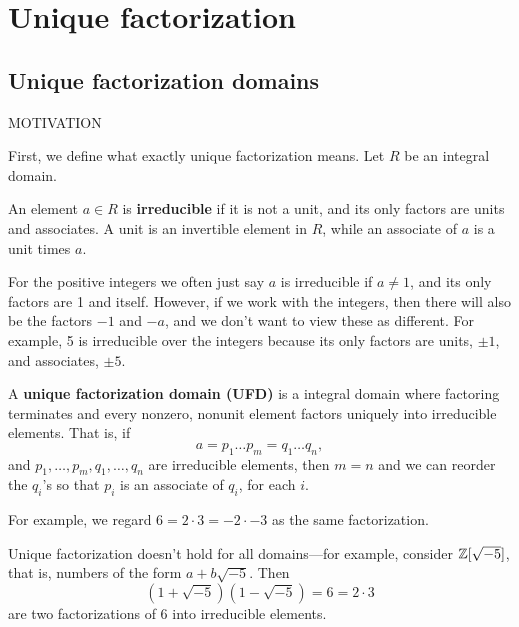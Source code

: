 \chapter{Unique factorization}\label{uf}
\section{Unique factorization domains}
MOTIVATION

First, we define what exactly unique factorization means. Let $R$ be an integral domain.
\begin{df}
An element $a\in R$ is \textbf{irreducible} if it is not a unit, and its only factors are units and associates. A unit is an invertible element in $R$, while an associate of $a$ is a unit times $a$.
\end{df}
For the positive integers we often just say $a$ is irreducible if $a\neq 1$, and its only factors are 1 and itself. However, if we work with the integers, then there will also be the factors $-1$ and $-a$, and we don't want to view these as different. For example, 5 is irreducible over the integers because its only factors are units, $\pm1$, and associates, $\pm 5$.

\begin{df}
A \textbf{unique factorization domain (UFD)} is a integral domain where factoring terminates and every nonzero, nonunit element factors uniquely into irreducible elements. That is, if 
\[
a=p_1\ldots p_m=q_1\ldots q_n,
\]
and $p_1,\ldots, p_m,q_1,\ldots, q_n$ are irreducible elements, then $m=n$ and we can reorder the $q_i$'s so that $p_i$ is an associate of $q_i$, for each $i$.
\end{df}
For example, we regard $6=2\cdot 3=-2\cdot -3$ as the same factorization.

Unique factorization doesn't hold for all domains---for example, consider $\mathbb{Z}[\sqrt{-5}]$, that is, numbers of the form $a+b\sqrt{-5}$. Then
\[
(1+\sqrt{-5})(1-\sqrt{-5})=6=2\cdot 3
\]
are two factorizations of 6 into irreducible elements. 

